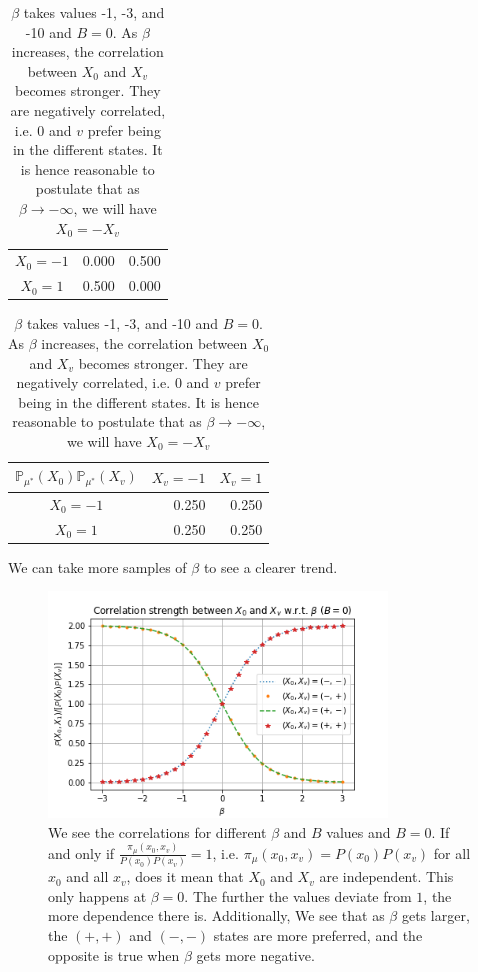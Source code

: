 \documentclass[12pt]{article}
\begin{document}
\begin{table}[h]
\begin{tabular}{c|rr}
        $X_0=-1$                       & 0.000                        & 0.500                       \\
        $X_0=1$                        & 0.500                        & 0.000
    \end{tabular}
    \quad\quad
    \begin{tabular}{c|rr}
        $\mathbb{P}_{\mu^*}(X_0)\mathbb{P}_{\mu^*}(X_v)$ & \multicolumn{1}{c}{$X_v=-1$} & \multicolumn{1}{c}{$X_v=1$} \\ \hline
        $X_0=-1$                                         & 0.250                        & 0.250                       \\
        $X_0=1$                                          & 0.250                        & 0.250
    \end{tabular}
    \caption{$\beta$ takes values -1, -3, and -10 and $B=0$. As $\beta$ increases, the correlation between $X_0$ and $X_v$ becomes stronger.  They are negatively correlated, i.e. $0$ and $v$ prefer being in the different states. It is hence reasonable to postulate that as $\beta\rightarrow-\infty$, we will have $X_0=-X_v$}
    \label{Tab. beta-neg-B0}
\end{table}

\newpage

We can take more samples of $\beta$ to see a clearer trend.
\begin{figure}[h]
    \centering
    \includegraphics[width=9cm]{img/ising_x0_xv.png}
    \caption{
        We see the correlations for different $\beta$ and $B$ values and $B=0$.
        If and only if $\frac{\pi_{\mu}(x_0, x_v)}{P(x_0)P(x_v)}=1$,
        i.e. $\pi_{\mu}(x_0, x_v) = P(x_0)P(x_v)$ for all $x_0$ and all $x_v$,
        does it mean that $X_0$ and $X_v$ are independent. This only happens at $\beta=0$. The further the values deviate from $1$,
        the more dependence there is. Additionally, We see that as $\beta$ gets
        larger, the $(+, +)$ and $(-, -)$ states are more preferred, and the opposite is true when $\beta$ gets more negative.}
    \label{Fig. x0-xv-correlation}
\end{figure}
\end{document}

